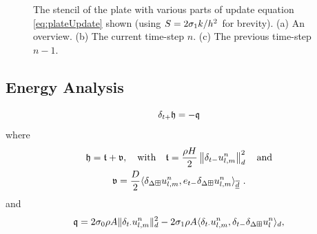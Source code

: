 \begin{figure}[t]
    \caption{The stencil of the plate with various parts of update equation \eqref{eq:plateUpdate} shown (using $S = 2\sigma_{1} k/h^2$ for brevity). (a) An overview. (b) The current time-step $n$. (c) The previous time-step $n-1$. \label{fig:plateStencil}}
\end{figure}

\subsection{Energy Analysis}
\begin{equation}
    \delta_{t+} \mathfrak{h} = -\mathfrak{q} 
\end{equation}
where 
\begin{equation}\label{eq:energyBalanceThinPlate}
    \begin{gathered}
        \mathfrak{h} = \mathfrak{t} + \mathfrak{v}, \quad \text{with} \quad \mathfrak{t} = \frac{\rho H}{2} \left\lVert\delta_{t-}u_{l,m}^n\right\rVert_{d}^2 \quad \text{and} \\
        \mathfrak{v} = \frac{D}{2}\langle\delta_{\Delta\boxplus} u_{l,m}^n, e_{t-}\delta_{\Delta\boxplus} u_{l,m}^n\rangle_{\overline{\underline{d}}}\ .
    \end{gathered}
\end{equation}
and 
\begin{equation}\label{eq:dampingTermThinPlate}
    \mathfrak{q} = 2\sigma_{0} \rho A \lVert\delta_{t\cdot}u_{l,m}^n\rVert_d^2 - 2 \sigma_{1} \rho A \langle \delta_{t\cdot} u_{l,m}^n, \delta_{t-} \delta_{\Delta\boxplus}u_l^n \rangle_d,
\end{equation}

